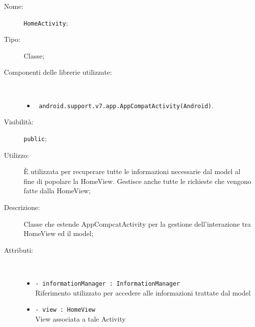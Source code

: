 \documentclass[../DefinizioneDiProdotto.tex]{subfiles}
\begin{document}
    \begin{description}
\item[Nome:] \texttt{HomeActivity};
\item[Tipo:] Classe;
\item[Componenti delle librerie utilizzate:] \
\begin{itemize}
\item \texttt{ android.support.v7.app.AppCompatActivity(Android)}.

\end{itemize}
\item[Visibilità:] \texttt{public};
\item[Utilizzo:] È utilizzata per recuperare tutte le informazioni necessarie dal model al fine di popolare la HomeView. Gestisce anche tutte le richieste che vengono fatte dalla HomeView;
\item[Descrizione:] Classe che estende AppCompcatActivity per la gestione dell'interazione tra HomeView ed il model;
\item[Attributi:] \
\begin{itemize}
\item \texttt{- informationManager : InformationManager}\\
Riferimento utilizzato per accedere alle informazioni trattate dal model

\item \texttt{- view : HomeView}\\
View associata a tale Activity


\end{itemize}
\end{description}
\end{document}
